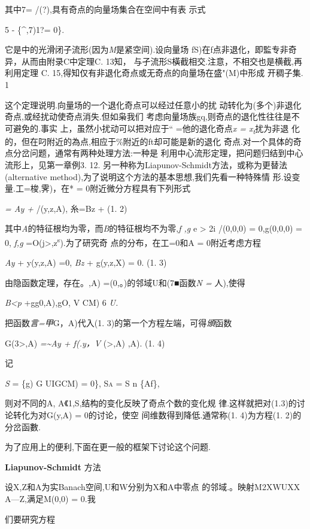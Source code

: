 \documentclass{article}
\begin{document}
其中7= /(?),具有奇点的向量场集合在空间中有表 示式

5 - \{\^{},7)1?= 0\}.

它是中的光滑闭子流形(因为\emph{M}是紧空间).设向量场
fS)在f点非退化，即監专非奇异，从而由附录C中定理C. 13知，
与孑流形S橫截相交.注意，不相交也是横截,再利用定理 C.
15,得知仅有非退化奇点或无奇点的向量场在盛"(M)中形成 开稠子集. 1

这个定理说明.向量场的一个退化奇点可以经过任意小的扰
动转化为(多个)非退化奇点,或经扰动使奇点消失.但如枭我们
考虑向量场族gq,则奇点的退化性往往是不可避免的.事实
上，虽然小扰动可以把对应于`` =他的退化奇点\emph{x =
x\textsubscript{t}}扰为非退
化的，但在叼附近的為点,相应于\%附近的ft却可能是新的退化
奇点.对一个具体的奇点分岔问题，通常有两种处理方法:一种是
利用中心流形定理，把问题归结到中心流形上，见第一章例3. 12.
另一种称为Liapunov-Schmidt方法，或称为更替法(alternative
method),为了说明这个方法的基本思想,我们先看一种特殊情
形.设变量.工=梭,霁)，在* = 0附近微分方程具有下列形式

\emph{= Ay +} /(y,z,A), 糸=Bz + (1. 2)

其中\emph{A}的特征根均为零，而\emph{B}的特征根均不为零,\emph{f ,g} e
\textgreater{} 2i /(0,0,0) = 0,g(0,0,0) = 0, \emph{f,g}
=O(\textbar{}j\textgreater{},z\textbar{}\textsuperscript{s}).为了研究奇
点的分布，在工=0和A = 0附近考虑方程

\emph{Ay} + y(y,z,A) =0, \emph{Bz} + g(y,z,X) = 0. (1. 3)

由隐函数定理，存在。,A) =(0,。)的邻域U和(7■函数\emph{N =} 人),使得

\emph{B\textless{}p} +gg0,A),gO, V CM) 6 \emph{U.}

把函数\emph{言=甲}G，A)代入(1. 3)的第一个方程左端，可得\emph{頒}函数

G(3\textgreater{},A) \emph{=\textasciitilde{}Ay + f(.y，V}
(\textgreater{},A) ,A). (1. 4)

记

\emph{S} = \{g) G UIGCM) = 0\}, \textsc{Sa} = S n \{Af\},

则对不同的A, \textbar{}A\textbar{}《1,S,结构的变化反映了奇点个数的变化规
律.这样就把对(1.3)的讨论转化为对G(y,A) = 0的讨论，使空
间维数得到降低.通常称(1. 4)为方程(1. 2)的分岔函數.

为了应用上的便利,下面在更一般的框架下讨论这个问题.

\textbf{Liapunov-Schmidt} 方法

设X,Z和A为实Banach空间,U和W分别为X和A中零点 的邻域.。映射M2XWUXX
A---Z,满足M(0,0) = 0.我

们要研究方程
\end{document}
